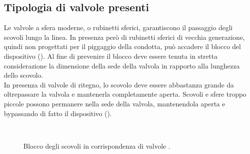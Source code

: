 \subsection{Tipologia di valvole presenti}
Le valvole a sfera moderne, o rubinetti sferici, garantiscono il passaggio degli scovoli lungo la linea. In presenza però di rubinetti sferici di vecchia generazione, quindi non progettati per il piggaggio della condotta, può accadere il blocco del dispositivo (). Al fine di prevenire il blocco deve essere tenuta in stretta considerazione la dimensione della sede della valvola in rapporto alla lunghezza dello scovolo.\\
In presenza di valvole di ritegno, lo scovolo deve essere abbastanza grande da oltrepassare la valvola e mantenerla completamente aperta. Scovoli e sfere troppo piccole possono permanere nella sede della valvola, mantenendola aperta e bypassando di fatto il dispositivo ().
\begin{figure}[htbp]
    \centering
    \qquad
    \\
    \caption{Blocco degli scovoli in corrispondenza di valvole \parencite{guadagni2003prontuario}.}
    \label{fig:piggaggio-valvole}
\end{figure}

